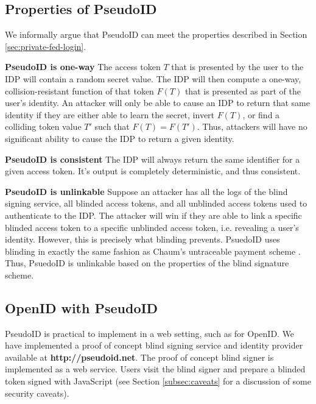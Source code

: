\documentclass{llncs}
\begin{document}
\subsection{Properties of PseudoID}

We informally argue that PseudoID can meet the properties described in
Section \ref{sec:private-fed-login}. 

\begin{claim}[1]\textbf{PseudoID is one-way}
  The access token $T$ that is presented by the user to the IDP will
  contain a random secret value. The IDP will then compute a one-way,
  collision-resistant function of that token $F(T)$ that is presented
  as part of the user's identity. An attacker will only be able to
  cause an IDP to return that same identity if they are either able to
  learn the secret, invert $F(T)$, or find a colliding token value
  $T'$ such that $F(T) = F(T')$. Thus, attackers will have no
  significant ability to cause the IDP to return a given identity.
\end{claim}


\begin{claim}[2]\textbf{PseudoID is consistent}
  The IDP will always return the same identifier for a given access
  token. It's output is completely deterministic, and thus consistent.
\end{claim}

\begin{claim}[2]\textbf{PseudoID is unlinkable}
  Suppose an attacker has all the logs of the blind signing service,
  all blinded access tokens, and all unblinded access tokens used to
  authenticate to the IDP. The attacker will win if they are able to
  link a specific blinded access token to a specific unblinded access
  token, i.e. revealing a user's identity. However, this is precisely
  what blinding prevents. PsuedoID uses blinding in exactly the same
  fashion as Chaum's untraceable payment scheme \cite{Cha82}. Thus,
  PsuedoID is unlinkable based on the properties of the blind
  signature scheme.
\end{claim}

\subsection{OpenID with PseudoID}

PseudoID is practical to implement in a web setting, such as for
OpenID. We have implemented a proof of concept blind signing service
and identity provider available at \textbf{http://pseudoid.net}. The
proof of concept blind signer is implemented as a web service. Users
visit the blind signer and prepare a blinded token signed with
JavaScript (see Section \ref{subsec:caveats} for a discussion of some
security caveats).
\end{document}

